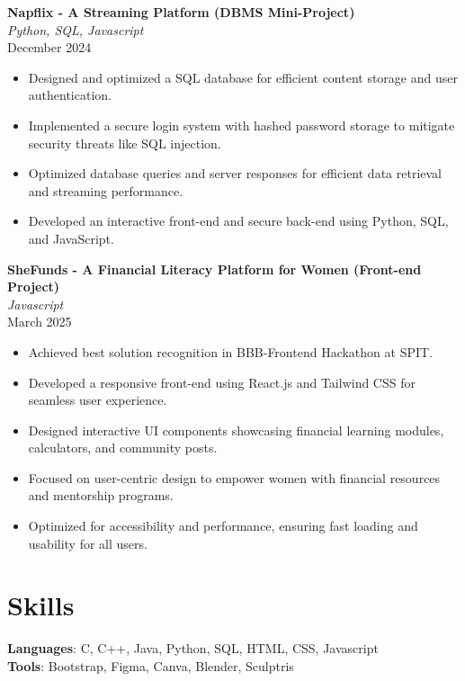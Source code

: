 \documentclass[letterpaper,10pt]{article}
\begin{document}
\textbf{Napflix - A Streaming Platform (DBMS Mini-Project)} \\
\textit{Python, SQL, Javascript} \\
December 2024
\begin{itemize}
    \item Designed and optimized a SQL database for efficient content storage and user authentication.
    \item Implemented a secure login system with hashed password storage to mitigate security threats like SQL injection.
    \item Optimized database queries and server responses for efficient data retrieval and streaming performance.
    \item Developed an interactive front-end and secure back-end using Python, SQL, and JavaScript.
\end{itemize}

\textbf{SheFunds - A Financial Literacy Platform for Women (Front-end Project)} \\
\textit{Javascript} \\
March 2025
\begin{itemize}
    \item Achieved best solution recognition in BBB-Frontend Hackathon at SPIT.
    \item Developed a responsive front-end using React.js and Tailwind CSS for seamless user experience.
    \item Designed interactive UI components showcasing financial learning modules, calculators, and community posts.
    \item Focused on user-centric design to empower women with financial resources and mentorship programs.
    \item Optimized for accessibility and performance, ensuring fast loading and usability for all users.
\end{itemize}

\section*{Skills}
\textbf{Languages}: C, C++, Java, Python, SQL, HTML, CSS, Javascript \\
\textbf{Tools}: Bootstrap, Figma, Canva, Blender, Sculptris
\end{document}
